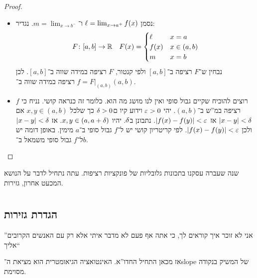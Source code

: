 \documentclass[name=רשימות חשבון דיפרנציאלי ואינטגרלי 1א]{../../../tex/classes/megasumPreamble}
\begin{document}
	\begin{proof}
		\begin{itemize}
			\item[$\implies$]נסמן $\ell = \lim_{x \to a^{+}} f(x)$ ו־$m = \lim_{x \to b^{-}}$. נגדיר:
			\[ F \colon [a, b] \to \mathbb{R} \quad F(x) = \begin{cases}
				\ell & x = a \\
				f(x) & x \in (a, b) \\
				m & x = b
			\end{cases} \]
			נבחין ש־$F$ רציפה ב־$[a, b]$ ולפי קנטור, $F$ רציפה במידה שווה ב־$[a, b]$. לכן $f = F|_{(a, b)}$ רציפה במידה שווה ב־$(a, b)$.
			\item[$\impliedby$]רוצים להוכיח שקיים גבול סופי ואין לנו מושג מה הוא. כלומר זה כנראה קושי. נניח כי $f$ רציפה במ''ש ב־$(a, b)$. יהי $\eg > 0$ וידוע קיו ם$\delta > 0$ כך שלכל $x, y \in (a, b)$ אם $\left \lvert x - y \right \rvert < \delta$ אז $\sof{f(x) - f(y)} < \eg$. נתבונן ב$\delta$. יהיו $x, y \in (a, a + \delta)$. אז $\left \lvert x - y \right \rvert < \delta$ ולכן $\sof{f(x) - f(y)} < \eg$. לפי קריטריון קושי יש ל־$f$ גבול סופי ב־$a$ מימין. באופן דומה יש ל־$f$ גבול סופי משמאל ב־$b$.
		\end{itemize}\envendproof
	\end{proof}




	שנה שעברה עסקנו בתכונות גלובליות של פונקציות רציפות. עתה נתחיל לדבר על הנושא המכעט אחרון, גזירות.

	\section[גזירות]{}
	\subsection{הגדרת גזירות}

	''אני לא זוכר איך קוראים לך, כי אתה אף פעם לא מדבר איתי אלא רק עם האנשים הקרובים אליך``

	אז מכאן התחיל החדו''א. האינטואציה הגיאומטרית הוא מציאת ה־slope של המשיק בנקודה מסוימת.
\end{document}

